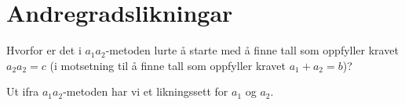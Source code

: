 




\section{Andregradslikningar}
\opgt


Hvorfor er det i $ a_1 a_2$-metoden lurte å starte med å finne tall som oppfyller kravet $ a_2a_2=c $ (i motsetning til å finne tall som oppfyller kravet $ a_1+a_2=b $)?

Ut ifra $ a_1a_2 $-metoden har vi et likningssett for $ a_1 $ og $ a_2 $.



